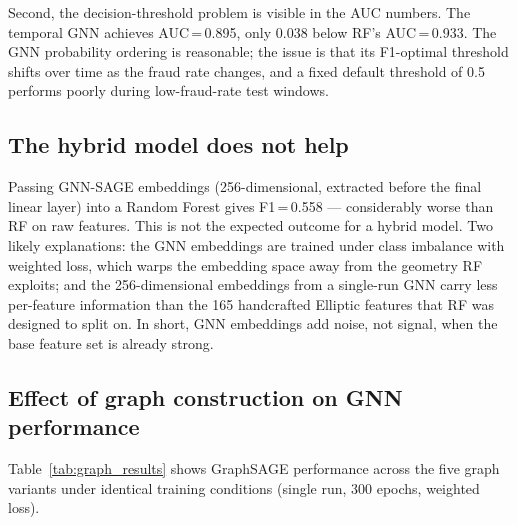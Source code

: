 Second, the decision-threshold problem is visible in the AUC numbers. The
temporal GNN achieves AUC\,=\,0.895, only 0.038 below RF's AUC\,=\,0.933.
The GNN probability ordering is reasonable; the issue is that its F1-optimal
threshold shifts over time as the fraud rate changes, and a fixed default
threshold of 0.5 performs poorly during low-fraud-rate test windows.

\subsection{The hybrid model does not help}

Passing GNN-SAGE embeddings (256-dimensional, extracted before the final
linear layer) into a Random Forest gives F1\,=\,0.558 — considerably worse
than RF on raw features. This is not the expected outcome for a hybrid model.
Two likely explanations: the GNN embeddings are trained under class imbalance
with weighted loss, which warps the embedding space away from the geometry RF
exploits; and the 256-dimensional embeddings from a single-run GNN carry less
per-feature information than the 165 handcrafted Elliptic features that RF
was designed to split on. In short, GNN embeddings add noise, not signal,
when the base feature set is already strong.



\subsection{Effect of graph construction on GNN performance}
\label{sec:graph_construction_results}

Table~\ref{tab:graph_results} shows GraphSAGE performance across the five
graph variants under identical training conditions (single run, 300 epochs,
weighted loss).

